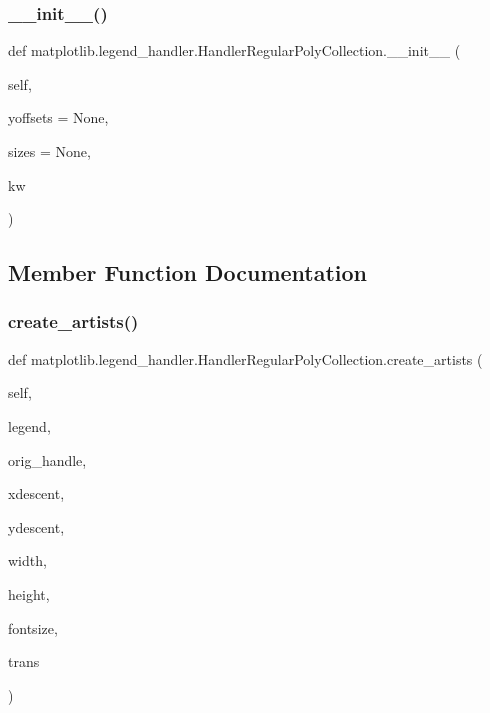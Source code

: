 \subsubsection{\texorpdfstring{\+\_\+\+\_\+init\+\_\+\+\_\+()}{\_\_init\_\_()}}
{\footnotesize\ttfamily def matplotlib.\+legend\+\_\+handler.\+Handler\+Regular\+Poly\+Collection.\+\_\+\+\_\+init\+\_\+\+\_\+ (\begin{DoxyParamCaption}\item[{}]{self,  }\item[{}]{yoffsets = {\ttfamily None},  }\item[{}]{sizes = {\ttfamily None},  }\item[{}]{kw }\end{DoxyParamCaption})}



\subsection{Member Function Documentation}
\mbox{\label{classmatplotlib_1_1legend__handler_1_1HandlerRegularPolyCollection_ac5193d87c40ea397fe4faa6e15ba43b0}} 
\subsubsection{\texorpdfstring{create\+\_\+artists()}{create\_artists()}}
{\footnotesize\ttfamily def matplotlib.\+legend\+\_\+handler.\+Handler\+Regular\+Poly\+Collection.\+create\+\_\+artists (\begin{DoxyParamCaption}\item[{}]{self,  }\item[{}]{legend,  }\item[{}]{orig\+\_\+handle,  }\item[{}]{xdescent,  }\item[{}]{ydescent,  }\item[{}]{width,  }\item[{}]{height,  }\item[{}]{fontsize,  }\item[{}]{trans }\end{DoxyParamCaption})}

